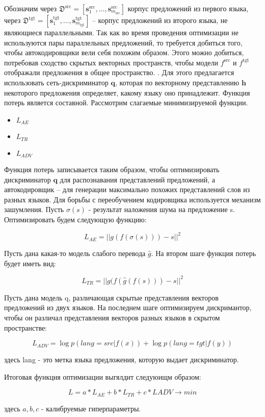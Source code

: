 \documentclass[12pt,twoside]{article}
\begin{document}
Обозначим через $\mathfrak{D}^{\text{src}} = [\mathbf{s}_1^{\text{src}}, \dots, \mathbf{s}_{m_\text{src}}^{\text{src}}]$ корпус предложений из первого языка, через $\mathfrak{D}^{\text{tgt}} = [\mathbf{s}_1^{\text{tgt}}, \dots, \mathbf{s}_{m_\text{tgt}}^{\text{tgt}}]$ -- корпус предложений из второго языка, не являющиеся параллельными. Так как во время проведения оптимизации не используются пары параллельных предложений, то требуется добиться того, чтобы автокодировщики вели себя похожим образом. Этого можно добиться, потребовав сходство скрытых векторных пространств, чтобы модели $f^{\text{src}}$  и $f^{\text{tgt}}$ отображали предложения в общее пространство.
. Для этого предлагается использовать сеть-дискриминатор $\mathbf{q}$, которая по векторному представлению $\mathbf{h}$ некоторого предложения определяет, какому языку оно принадлежит. Функция потерь является составной. Рассмотрим слагаемые минимизируемой функции.\begin{itemize}
\item $L_{AE}$
\item $L_{TR}$
\item $L_{ADV}$
\end{itemize}
 Функция потерь записывается таким образом, чтобы оптимизировать дискриминатор $\mathbf{q}$ для распознавания представлений предложений, а автокодировщик -- для генерации максимально похожих представлений слов из разных языков. Для борьбы с переобучением кодировщика используется механизм зашумления. Пусть $\sigma(s)$ - результат наложения шума на предложение s.  Оптимизировать будем  следующую функцию:

$$L_{AE} = ||g(f(\sigma(s)))-s||^2$$

Пусть дана какая-то модель слабого перевода $\hat{g}$. На втором шаге  функция потерь будет иметь вид:

$$L_{TR} = ||g(f(\hat{g}(f(s))) - s||^2$$

Пусть дана модель q, различающая скрытые представления векторов предложений из двух языков. На последнем шаге оптимизируем дискримантор, чтобы он различал представления векторов разных языков в скрытом пространстве:

$$L_{ADV} = \log p(lang = src| f(x)) + \log p(lang = tgt|f(y))$$

здесь lang - это метка языка предложения, которую выдает дискриминатор.
 	
\vspace{\baselineskip}
Итоговая функция оптимизации выгялдит следуюищм образом:

$$L = a*L_{AE} + b*L_{TR}+c*L{ADV} \longrightarrow min$$

здесь $a,b,c$ - калибруемые гиперпараметры.


\newpage


\end{document}
